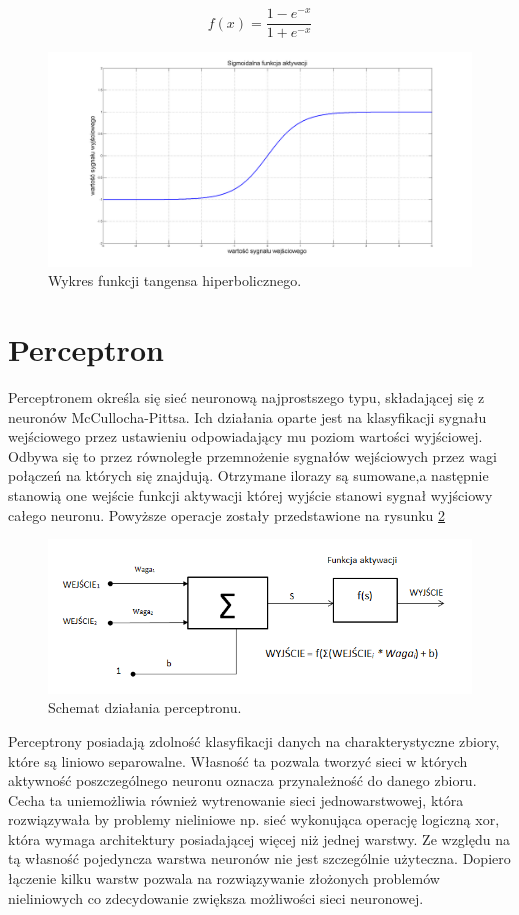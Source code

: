 $$ 
f(x) = \frac{1 - e^{-x}}{1 + e^{-x}}
$$

\begin{figure}[!htbp]
\centering
\includegraphics[width=1\linewidth]{./include/tanh}
\caption{Wykres funkcji tangensa hiperbolicznego.}
\label{fig:tanh}
\end{figure}

\section{Perceptron}
Perceptronem określa się sieć neuronową najprostszego typu, składającej się z neuronów McCullocha-Pittsa. Ich działania oparte jest na klasyfikacji sygnału wejściowego przez ustawieniu odpowiadający mu poziom wartości wyjściowej. 
Odbywa się to przez równoległe przemnożenie sygnałów wejściowych przez wagi połączeń na których się znajdują. Otrzymane ilorazy są sumowane,a następnie stanowią one wejście funkcji aktywacji której wyjście stanowi sygnał wyjściowy całego neuronu. Powyższe operacje zostały przedstawione na rysunku \ref{fig:flow}

\begin{figure}[!htbp]
\centering
\includegraphics[width=1\linewidth]{./include/flow}
\caption{Schemat działania perceptronu.}
\label{fig:flow}
\end{figure}
 
 
Perceptrony posiadają zdolność klasyfikacji danych na charakterystyczne zbiory, które są liniowo separowalne. Własność ta pozwala tworzyć sieci w których aktywność poszczególnego neuronu oznacza przynależność do danego zbioru. Cecha ta uniemożliwia również wytrenowanie sieci jednowarstwowej, która rozwiązywała by problemy nieliniowe np. sieć wykonująca operację logiczną xor, która wymaga architektury posiadającej więcej niż jednej warstwy. 
Ze względu na tą własność pojedyncza warstwa neuronów nie jest szczególnie użyteczna. Dopiero łączenie kilku warstw pozwala na rozwiązywanie złożonych problemów nieliniowych co zdecydowanie zwiększa możliwości sieci neuronowej. 

